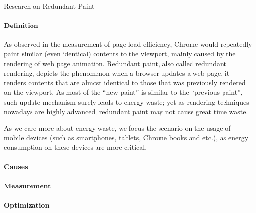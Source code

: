 \documentclass[12pt]{article}
\begin{document}
\centerline{\large{Research on Redundant Paint}}

\paragraph{Definition} As observed in the measurement of page load efficiency, Chrome would repeatedly paint similar (even identical) contents to the viewport, mainly caused by the rendering of web page animation. Redundant paint, also called redundant rendering, depicts the phenomenon when a browser updates a web page, it renders contents that are almost identical to those that was previously rendered on the viewport. As most of the ``new paint'' is similar to the ``previous paint'', such update mechanism surely leads to energy waste; yet as rendering techniques nowadays are highly advanced, redundant paint may not cause great time waste. 

As we care more about energy waste, we focus the scenario on the usage of mobile devices (such as smartphones, tablets, Chrome books and etc.), as energy consumption on these devices are more critical.

\paragraph{Causes}

\paragraph{Measurement}

\paragraph{Optimization}
\end{document}
